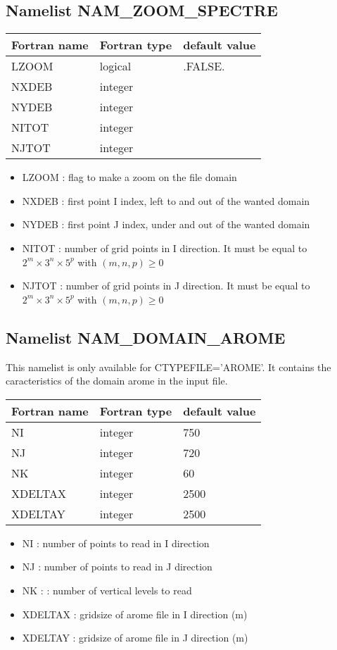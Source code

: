 \subsection{Namelist NAM\_ZOOM\_SPECTRE}

\begin{center}
\begin{tabular} {|l|l|l|}
\hline
Fortran name & Fortran type & default value \\
\hline
LZOOM &  logical &.FALSE. \\
NXDEB & integer & \\
NYDEB& integer & \\
NITOT& integer & \\
NJTOT& integer & \\
\hline
\end{tabular}
\end{center}

\begin{itemize}
\item LZOOM : flag to make a zoom on the file domain
\item NXDEB : first point I index, left to and out of the wanted domain
\item NYDEB : first point J index, under and out of the wanted domain
\item NITOT : number of grid points in I direction. It must be equal to $2^m \times 3^n \times 5^p$ with $(m,n,p) \ge 0 $
\item NJTOT : number of grid points in J direction. It must be equal to $2^m \times 3^n \times 5^p$ with $(m,n,p) \ge 0$
\end{itemize}

\subsection{Namelist NAM\_DOMAIN\_AROME}
This namelist is only available for CTYPEFILE='AROME'. It contains the caracteristics of the domain arome in the input file.

\begin{center}
\begin{tabular} {|l|l|l|}
\hline
Fortran name & Fortran type & default value \\
\hline
NI & integer & 750\\
NJ& integer & 720\\
NK& integer & 60\\
XDELTAX& integer & 2500\\
XDELTAY& integer & 2500\\
\hline
\end{tabular}
\end{center}

\begin{itemize}
\item NI : number of points to read in I direction 
\item NJ : number of points to read in J direction 
\item NK : : number of vertical levels to read 
\item XDELTAX : gridsize of arome file in I direction (m)
\item XDELTAY : gridsize of arome file in J direction (m)
\end{itemize}


